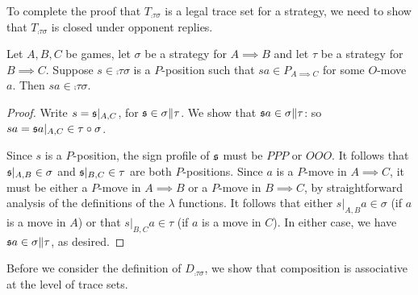 \documentclass{article}
\begin{document}
To complete the proof that $T_{\comp\tau\sigma}$ is a legal trace set for a strategy, we need to show that $T_{\comp\tau\sigma}$ is closed under opponent replies.

\begin{proposition}
  Let $A,B,C$ be games, let $\sigma$ be a strategy for $A\implies B$ and let $\tau$ be a strategy for $B\implies C$.  Suppose $s\in\comp\tau\sigma$ is a $P$-position such that $sa\in P_{A\implies C}$ for some $O$-move $a$.  Then $sa\in\comp\tau\sigma$.

  \begin{proof}
    Write $s=\mathfrak s\vert_{A,C}$, for $\mathfrak s\in\sigma\|\tau$.  We show that $\mathfrak s a\in\sigma\|\tau$: so $sa = \mathfrak s a\vert_{A,C}\in\tau \circ \sigma$.  

    Since $s$ is a $P$-position, the sign profile of $\mathfrak s$ must be $PPP$ or $OOO$.  It follows that $\mathfrak s\vert_{A,B}\in\sigma$ and $\mathfrak s\vert_{B,C}\in\tau$ are both $P$-positions.  Since $a$ is a $P$-move in $A\implies C$, it must be either a $P$-move in $A\implies B$ or a $P$-move in $B\implies C$, by straightforward analysis of the definitions of the $\lambda$ functions.  It follows that either $s\vert_{A,B}a\in\sigma$ (if $a$ is a move in $A$) or that $s\vert_{B,C}a\in\tau$ (if $a$ is a move in $C$).  In either case, we have $\mathfrak s a\in\sigma\|\tau$, as desired.
  \end{proof}
\end{proposition}

Before we consider the definition of $D_{\comp\tau\sigma}$, we show that composition is associative at the level of trace sets.  
\end{document}
